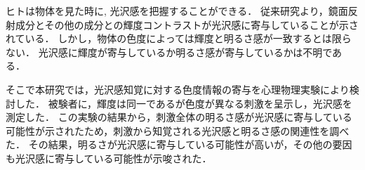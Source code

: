 ヒトは物体を見た時に, 光沢感を把握することができる．
従来研究より，鏡面反射成分とその他の成分との輝度コントラストが光沢感に寄与していることが示されている．
しかし，物体の色度によっては輝度と明るさ感が一致するとは限らない．
光沢感に輝度が寄与しているか明るさ感が寄与しているかは不明である．

そこで本研究では，光沢感知覚に対する色度情報の寄与を心理物理実験により検討した．
被験者に，輝度は同一であるが色度が異なる刺激を呈示し，光沢感を測定した．
この実験の結果から，刺激全体の明るさ感が光沢感に寄与している可能性が示されたため，刺激から知覚される光沢感と明るさ感の関連性を調べた．
その結果，明るさが光沢感に寄与している可能性が高いが，その他の要因も光沢感に寄与している可能性が示唆された．
